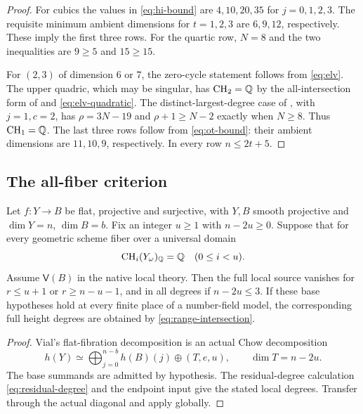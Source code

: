 \begin{proof}
For cubics the values in \eqref{eq:hi-bound} are
$4,10,20,35$ for $j=0,1,2,3$. The requisite minimum ambient
dimensions for $t=1,2,3$ are $6,9,12$, respectively. These imply
the first three rows. For the quartic row, $N=8$ and the two
inequalities are $9\geq5$ and $15\geq15$.

For $(2,3)$ of dimension $6$ or $7$, the zero-cycle statement
follows from \eqref{eq:elv}. The upper quadric, which may be
singular, has $\operatorname{CH}_2=\mathbb Q$ by the all-intersection form of
\cite[Theorem 4.6]{ELV} and \eqref{eq:elv-quadratic}.
The distinct-largest-degree
case of \cite[Theorem 1.5]{HI}, with $j=1,c=2$, has
$\rho=3N-19$ and $\rho+1\geq N-2$ exactly when $N\geq8$.
Thus $\operatorname{CH}_1=\mathbb Q$. The last three rows follow from
\eqref{eq:ot-bound}: their ambient dimensions are $11,10,9$,
respectively. In every row $n\leq2t+5$.
\end{proof}

\subsection{The all-fiber criterion}

\begin{proposition}\label{prop:fibration}
Let $f:Y\to B$ be flat, projective and surjective, with $Y,B$
smooth projective and $\dim Y=n$, $\dim B=b$. Fix an integer
$u\geq1$ with $n-2u\geq0$. Suppose that for
every geometric scheme fiber over a universal domain
\[
 \operatorname{CH}_i(Y_\omega)_\mathbb Q=\mathbb Q\quad(0\leq i<u).
\]
Assume $\mathsf V(B)$ in the native local theory. Then the full
local source vanishes for $r\leq u+1$ or $r\geq n-u-1$, and in
all degrees if $n-2u\leq3$. If these base hypotheses hold at every
finite place of a number-field model, the corresponding full
height degrees are obtained by \eqref{eq:range-intersection}.
\end{proposition}

\begin{proof}
Vial's flat-fibration decomposition \cite[Theorem 4.2]{VialFibrations}
is an actual Chow decomposition
\begin{equation}\label{eq:fibration-motive}
 h(Y)\simeq\bigoplus_{j=0}^{n-b}h(B)(j)\oplus(T,e,u),
 \qquad\dim T=n-2u.
\end{equation}
The base summands are admitted by hypothesis. The residual-degree
calculation \eqref{eq:residual-degree} and the endpoint input give
the stated local degrees. Transfer through the actual diagonal
and apply  globally.
\end{proof}

